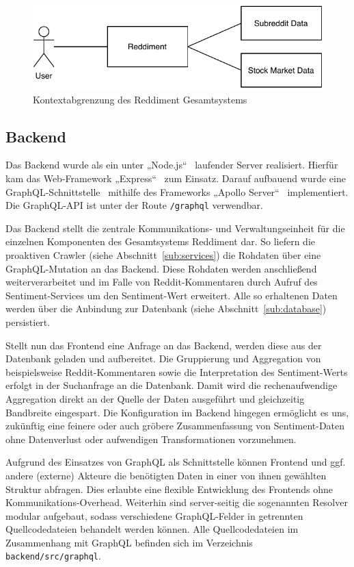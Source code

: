 \documentclass[a4paper, 10pt, conference]{IEEEtran}
\begin{document}
\begin{figure}[ht]
	\centering
	\includegraphics[width=\linewidth]{context}
	\caption{Kontextabgrenzung des Reddiment Gesamtsystems}
	\label{fig:context}
\end{figure}

\subsection{Backend} \label{sub:backend}
Das Backend wurde als ein unter „Node.js“~\cite{node} laufender Server realisiert. Hierfür kam das Web-Framework „Express“~\cite{express} zum Einsatz. Darauf aufbauend wurde eine GraphQL-Schnittstelle~\cite{graphql} mithilfe des Frameworks „Apollo Server“~\cite{apolloserver} implementiert. Die GraphQL-API ist unter der Route \texttt{/graphql} verwendbar.

Das Backend stellt die zentrale Kommunikations- und Verwaltungseinheit für die einzelnen Komponenten des Gesamtsystems Reddiment dar. So liefern die proaktiven Crawler (siehe Abschnitt~\ref{sub:services}) die Rohdaten über eine GraphQL-Mutation an das Backend. Diese Rohdaten werden anschließend weiterverarbeitet und im Falle von Reddit-Kommentaren durch Aufruf des Sentiment-Services um den Sentiment-Wert erweitert. Alle so erhaltenen Daten werden über die Anbindung zur Datenbank (siehe Abschnitt~\ref{sub:database}) persistiert.

Stellt nun das Frontend eine Anfrage an das Backend, werden diese aus der Datenbank geladen und aufbereitet. Die Gruppierung und Aggregation von beispielsweise Reddit-Kommentaren sowie die Interpretation des Sentiment-Werts erfolgt in der Suchanfrage an die Datenbank. Damit wird die rechenaufwendige Aggregation direkt an der Quelle der Daten ausgeführt und gleichzeitig Bandbreite eingespart. Die Konfiguration im Backend hingegen ermöglicht es uns, zukünftig eine feinere oder auch gröbere Zusammenfassung von Sentiment-Daten ohne Datenverlust oder aufwendigen Transformationen vorzunehmen.

Aufgrund des Einsatzes von GraphQL als Schnittstelle können Frontend und ggf. andere (externe) Akteure die benötigten Daten in einer von ihnen gewählten Struktur abfragen. Dies erlaubte eine flexible Entwicklung des Frontends ohne Kommunikations-Overhead. Weiterhin sind server-seitig die sogenannten Resolver modular aufgebaut, sodass verschiedene GraphQL-Felder in getrennten Quellcodedateien behandelt werden können. Alle Quellcodedateien im Zusammenhang mit GraphQL befinden sich im Verzeichnis \texttt{backend/src/graphql}.
\end{document}
